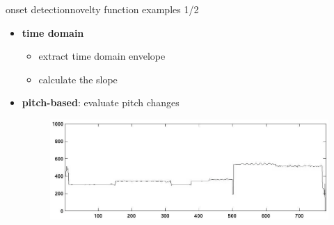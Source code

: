         \begin{frame}{onset detection}{novelty function examples 1/2}
            \begin{itemize}
                \item	\textbf{time domain}
                    \begin{itemize}
                        \item	extract time domain envelope
                        \item<2->	calculate the slope
                    \end{itemize}
                \item<3->	\textbf{pitch-based}: evaluate pitch changes
                        \begin{figure}[t]
                            \centering
                            \includegraphics[scale=.25]{graph/pitch_onset}
                        \end{figure}
            \end{itemize}
        \end{frame}
